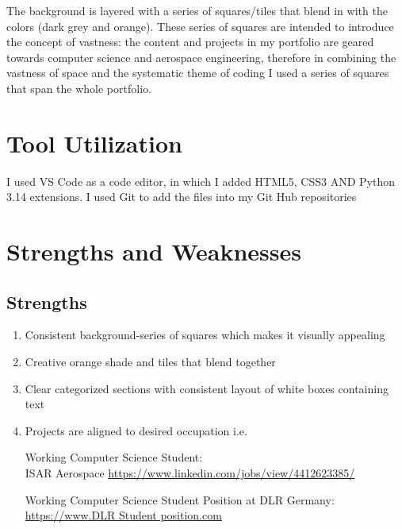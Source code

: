 \documentclass[12pt,a4paper,oneside]{report}
\begin{document}
\noindent
The background is layered with a series of squares/tiles that blend in with the colors (dark grey and orange). These series of squares are intended to introduce the concept of vastness: the content and projects in my portfolio are geared towards computer science and aerospace engineering, therefore in combining the vastness of space and the systematic theme of coding I used a series of squares that span the whole portfolio.


\section{Tool Utilization}
I used VS Code as a code editor, in which I added HTML5, CSS3 AND Python 3.14 extensions. I used Git to add the files into my Git Hub repositories



\section{Strengths and Weaknesses}
\subsection{Strengths}
\begin{enumerate}
    \item Consistent background-series of squares which makes it visually appealing
    \item Creative orange shade and tiles that blend together
    \item Clear categorized sections with consistent layout of white boxes containing text
    \item Projects are aligned to desired occupation i.e.
    
Working Computer Science Student:\\ ISAR Aerospace  \href{https://www.linkedin.com/jobs/view/4412623385/}{https://www.linkedin.com/jobs/view/4412623385/\faLink}


Working Computer Science Student Position at DLR Germany: \href{https://jobs.dlr.de/default/job/Student-%28mfd%29-Computer-Science%2C-Mathematics%2C-Data-Science%2C-Physics%2C-or-similar/5387-en_GB}{https://www.DLR Student position.com\faLink}
\end{enumerate}
\end{document}
